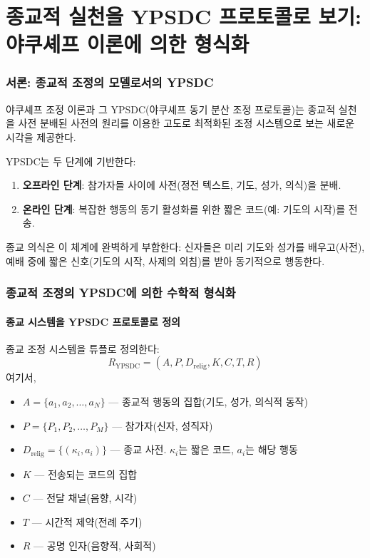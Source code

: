 \documentclass[12pt,a4paper]{article}
\begin{document}
	\tableofcontents
	
	\newpage
	
	\part{종교적 실천을 YPSDC 프로토콜로 보기: 야쿠셰프 이론에 의한 형식화}
	
	\section{서론: 종교적 조정의 모델로서의 YPSDC}
	
	야쿠셰프 조정 이론과 그 YPSDC(야쿠셰프 동기 분산 조정 프로토콜)는 종교적 실천을 사전 분배된 사전의 원리를 이용한 고도로 최적화된 조정 시스템으로 보는 새로운 시각을 제공한다.
	
	YPSDC는 두 단계에 기반한다:
	\begin{enumerate}
		\item \textbf{오프라인 단계}: 참가자들 사이에 사전(정전 텍스트, 기도, 성가, 의식)을 분배.
		\item \textbf{온라인 단계}: 복잡한 행동의 동기 활성화를 위한 짧은 코드(예: 기도의 시작)를 전송.
	\end{enumerate}
	
	종교 의식은 이 체계에 완벽하게 부합한다: 신자들은 미리 기도와 성가를 배우고(사전), 예배 중에 짧은 신호(기도의 시작, 사제의 외침)를 받아 동기적으로 행동한다.
	
	\section{종교적 조정의 YPSDC에 의한 수학적 형식화}
	
	\subsection{종교 시스템을 YPSDC 프로토콜로 정의}
	
	종교 조정 시스템을 튜플로 정의한다:
	\[
	R_{\mathrm{YPSDC}} = (A, P, D_{\mathrm{relig}}, K, C, T, R)
	\]
	여기서,
	\begin{itemize}
		\item $A = \{a_1, a_2, \ldots, a_N\}$ — 종교적 행동의 집합(기도, 성가, 의식적 동작)
		\item $P = \{P_1, P_2, \ldots, P_M\}$ — 참가자(신자, 성직자)
		\item $D_{\mathrm{relig}} = \{(\kappa_i, a_i)\}$ — 종교 사전. $\kappa_i$는 짧은 코드, $a_i$는 해당 행동
		\item $K$ — 전송되는 코드의 집합
		\item $C$ — 전달 채널(음향, 시각)
		\item $T$ — 시간적 제약(전례 주기)
		\item $R$ — 공명 인자(음향적, 사회적)
	\end{itemize}
	
\end{document}

